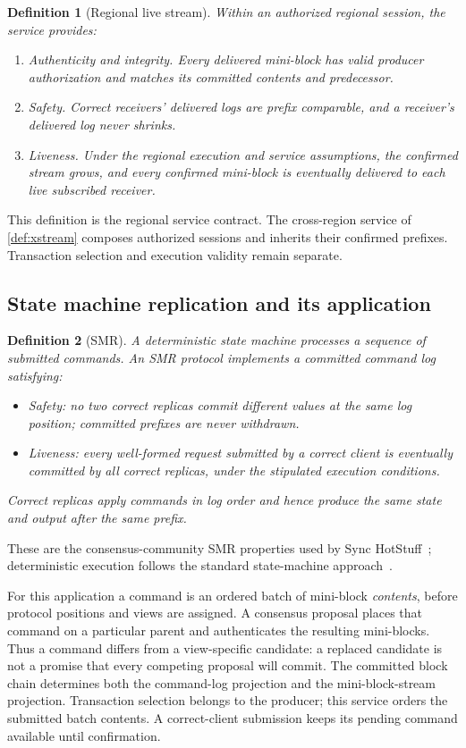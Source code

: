 \documentclass[11pt,a4paper,onecolumn]{article}
\newtheorem{definition}{Definition}[section]
\newcounter{protocol}
\begin{document}
\begin{definition}[Regional live stream]\label{def:stream}
Within an authorized regional session, the service provides:
\begin{enumerate}[label=(\roman*)]
\item \emph{Authenticity and integrity.} Every delivered mini-block has valid
producer authorization and matches its committed contents and predecessor.
\item \emph{Safety.} Correct receivers' delivered logs are prefix comparable,
and a receiver's delivered log never shrinks.
\item \emph{Liveness.} Under the regional execution and service assumptions,
the confirmed stream grows, and every confirmed mini-block is eventually
delivered to each live subscribed receiver.
\end{enumerate}
\end{definition}
This definition is the regional service contract. The cross-region service
of \cref{def:xstream} composes authorized sessions and inherits their confirmed
prefixes. Transaction selection and execution validity remain separate.

\subsection{State machine replication and its application}\label{sec:smr}
\begin{definition}[SMR]\label{def:smr}
A deterministic state machine processes a sequence of submitted commands.
An SMR protocol implements a committed command log satisfying:
\begin{itemize}
\item \emph{Safety:} no two correct replicas commit different values at the
same log position; committed prefixes are never withdrawn.
\item \emph{Liveness:} every well-formed request submitted by a correct client
is eventually committed by all correct replicas, under the stipulated
execution conditions.
\end{itemize}
Correct replicas apply commands in log order and hence produce the same state
and output after the same prefix.
\end{definition}
These are the consensus-community SMR properties used by Sync
HotStuff~\cite{synchotstuff}; deterministic execution follows the standard
state-machine approach~\cite{schneider}.

For this application a command is an ordered batch of mini-block
\emph{contents}, before protocol positions and views are assigned. A consensus
proposal places that command on a particular parent and authenticates the
resulting mini-blocks. Thus a command differs from a view-specific candidate:
a replaced candidate is not a promise that every competing proposal will
commit. The committed block chain determines both the command-log projection
and the mini-block-stream projection. Transaction selection belongs to the
producer; this service orders the submitted batch contents. A correct-client
submission keeps its pending command available until confirmation.
\end{document}
